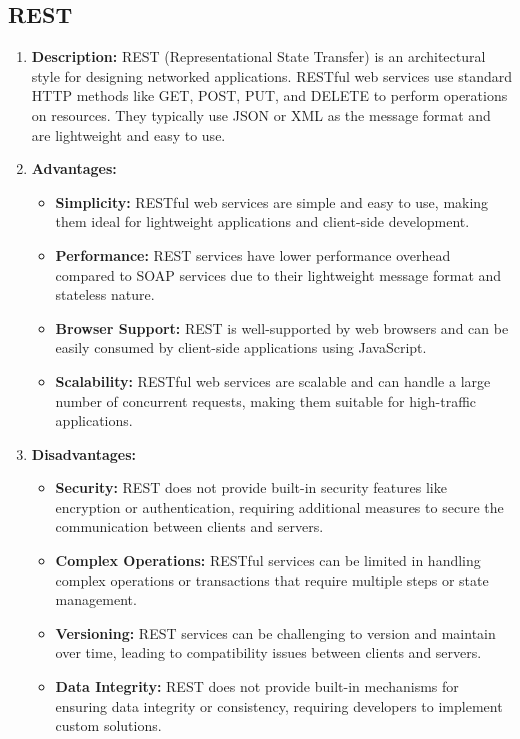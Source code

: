 \documentclass[11pt]{article}
\begin{document}
\subsection{REST}

\begin{enumerate}
    \item \textbf{Description:} REST (Representational State Transfer) is an architectural style for designing networked applications. RESTful web services use standard HTTP methods like GET, POST, PUT, and DELETE to perform operations on resources. They typically use JSON or XML as the message format and are lightweight and easy to use.
    \item \textbf{Advantages:}
          \begin{itemize}
              \item \textbf{Simplicity:} RESTful web services are simple and easy to use, making them ideal for lightweight applications and client-side development.
              \item \textbf{Performance:} REST services have lower performance overhead compared to SOAP services due to their lightweight message format and stateless nature.
              \item \textbf{Browser Support:} REST is well-supported by web browsers and can be easily consumed by client-side applications using JavaScript.
              \item \textbf{Scalability:} RESTful web services are scalable and can handle a large number of concurrent requests, making them suitable for high-traffic applications.
          \end{itemize}
    \item \textbf{Disadvantages:}
          \begin{itemize}
              \item \textbf{Security:} REST does not provide built-in security features like encryption or authentication, requiring additional measures to secure the communication between clients and servers.
              \item \textbf{Complex Operations:} RESTful services can be limited in handling complex operations or transactions that require multiple steps or state management.
              \item \textbf{Versioning:} REST services can be challenging to version and maintain over time, leading to compatibility issues between clients and servers.
              \item \textbf{Data Integrity:} REST does not provide built-in mechanisms for ensuring data integrity or consistency, requiring developers to implement custom solutions.

\end{itemize}
\end{enumerate}
\end{document}
